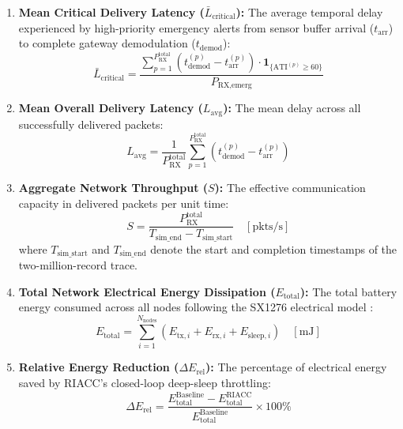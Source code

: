 \documentclass[preprint,review,12pt]{elsarticle}
\begin{document}
\begin{enumerate}
    \item \textbf{Mean Critical Delivery Latency ($\bar{L}_{\text{critical}}$):} The average temporal delay experienced by high-priority emergency alerts from sensor buffer arrival ($t_{\text{arr}}$) to complete gateway demodulation ($t_{\text{demod}}$):
    \begin{equation}
        \bar{L}_{\text{critical}} = \frac{\sum_{p=1}^{P_{\text{RX}}^{\text{total}}} \left( t_{\text{demod}}^{(p)} - t_{\text{arr}}^{(p)} \right) \cdot \mathbf{1}_{\{\text{ATI}^{(p)} \ge 60\}}}{P_{\text{RX}, \text{emerg}}}
        \label{eq:eval_lat_critical}
    \end{equation}

    \item \textbf{Mean Overall Delivery Latency ($L_{\text{avg}}$):} The mean delay across all successfully delivered packets:
    \begin{equation}
        L_{\text{avg}} = \frac{1}{P_{\text{RX}}^{\text{total}}} \sum_{p=1}^{P_{\text{RX}}^{\text{total}}} \left( t_{\text{demod}}^{(p)} - t_{\text{arr}}^{(p)} \right)
        \label{eq:lat_avg}
    \end{equation}

    \item \textbf{Aggregate Network Throughput ($S$):} The effective communication capacity in delivered packets per unit time:
    \begin{equation}
        S = \frac{ P_{\text{RX}}^{\text{total}} }{ T_{\text{sim\_end}} - T_{\text{sim\_start}} } \quad \left[\text{pkts/s}\right]
        \label{eq:throughput}
    \end{equation}
    where $T_{\text{sim\_start}}$ and $T_{\text{sim\_end}}$ denote the start and completion timestamps of the two-million-record trace.

    \item \textbf{Total Network Electrical Energy Dissipation ($E_{\text{total}}$):} The total battery energy consumed across all nodes following the SX1276 electrical model \cite{bouguera2018energy,semtech2020sx1276}:
    \begin{equation}
        E_{\text{total}} = \sum_{i=1}^{N_{\text{nodes}}} \left( E_{\text{tx},i} + E_{\text{rx},i} + E_{\text{sleep},i} \right) \quad \left[\text{mJ}\right]
        \label{eq:eval_e_total}
    \end{equation}

    \item \textbf{Relative Energy Reduction ($\Delta E_{\text{rel}}$):} The percentage of electrical energy saved by RIACC's closed-loop deep-sleep throttling:
    \begin{equation}
        \Delta E_{\text{rel}} = \frac{E_{\text{total}}^{\text{Baseline}} - E_{\text{total}}^{\text{RIACC}}}{E_{\text{total}}^{\text{Baseline}}} \times 100\%
        \label{eq:e_reduction}
    \end{equation}


\end{enumerate}
\end{document}
